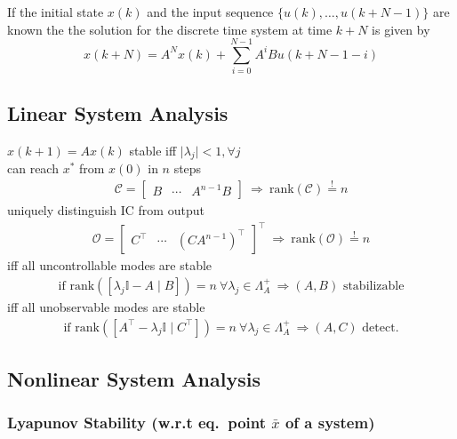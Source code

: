 If the initial state $x(k)$ and the input sequence $\{u(k), \ldots, u(k+N-1)\}$ are known the the solution for the discrete time system at time $k+N$ is given by
\begin{equation*}
    x(k+N) = A^N x(k) + \sum_{i=0}^{N-1} A^i B u(k+N-1-i)
\end{equation*}


\subsection{Linear System Analysis}
 $x(k+1) = Ax(k)$ stable iff $\lvert \lambda_j \rvert < 1, \forall j$ \\
 can reach $x^*$ from $x(0)$ in $n$ steps
\begin{align*}
    \mathcal{C} =
    \begin{bmatrix}
        B & \cdots & A^{n-1} B
    \end{bmatrix}
    \ \Rightarrow \ \mathrm{rank}(\mathcal{C}) \overset{!}{=} n
\end{align*}
 uniquely distinguish IC from output
\begin{align*}
    \mathcal{O} =
    \begin{bmatrix}
        C^\top & \cdots & {(CA^{n-1})}^\top
    \end{bmatrix}^\top
    \ \Rightarrow \ \mathrm{rank}(\mathcal{O}) \overset{!}{=} n
\end{align*}
 iff all uncontrollable modes are stable
\begin{align*}
    \textrm{if } \mathrm{rank}([\lambda_j \mathbb{I}-A \mid B]) = n \ \forall \lambda_j \in \Lambda_A^+ \ \Rightarrow (A,B) \textrm{ stabilizable}
\end{align*}
 iff all unobservable modes are stable
\begin{align*}
    \textrm{if } \mathrm{rank}([A^\top - \lambda_j \mathbb{I} \mid C^\top]) = n \ \forall \lambda_j \in \Lambda_A^+ \ \Rightarrow (A,C) \textrm{ detect.}
\end{align*}


\subsection{Nonlinear System Analysis}
\subsubsection[Lyapunov Stability]{Lyapunov Stability (w.r.t \textbf{eq.\ point} $\bar{x}$ of a system)}


